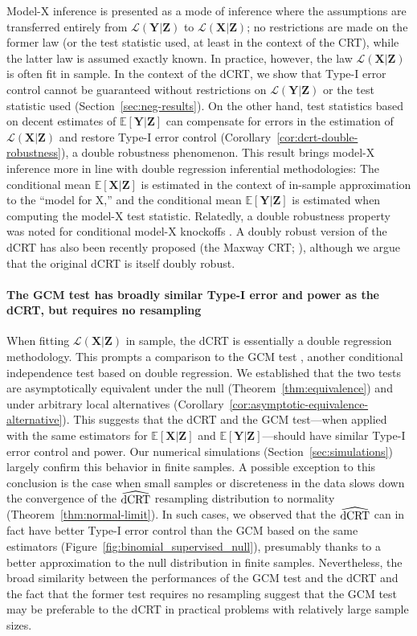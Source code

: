 \documentclass[aos]{imsart}
\theoremstyle{plain}
\theoremstyle{remark}
\newcommand{\E}{\mathbb E}								%
\newcommand{\prx}{\bm X}								%
\newcommand{\prz}{\bm Z}								%
\newcommand{\pry}{{\bm Y}}								%
\newcommand{\law}{\mathcal L}							%
\newcommand{\dCRThat}{\widehat{\textnormal{dCRT}}}		%
\begin{document}
Model-X inference \citep{CetL16} is presented as a mode of inference where the assumptions are transferred entirely from $\law(\pry|\prz)$ to $\law(\prx|\prz)$; no restrictions are made on the former law (or the test statistic used, at least in the context of the CRT), while the latter law is assumed exactly known. In practice, however, the law $\law(\prx|\prz)$ is often fit in sample. In the context of the dCRT, we show that Type-I error control cannot be guaranteed without restrictions on $\law(\pry|\prz)$ or the test statistic used (Section~\ref{sec:neg-results}). On the other hand, test statistics based on decent estimates of $\E[\pry|\prz]$ can compensate for errors in the estimation of $\law(\prx|\prz)$ and restore Type-I error control (Corollary~\ref{cor:dcrt-double-robustness}), a double robustness phenomenon. This result brings model-X inference more in line with double regression inferential methodologies: The conditional mean $\E[\prx|\prz]$ is estimated in the context of in-sample approximation to the ``model for X,'' and the conditional mean $\E[\pry|\prz]$ is estimated when computing the model-X test statistic. Relatedly, a double robustness property was noted for conditional model-X knockoffs \citep{Huang2019}. A doubly robust version of the dCRT has also been recently proposed (the Maxway CRT; \cite{Li2022}), although we argue that the original dCRT is itself doubly robust.

\paragraph*{The GCM test has broadly similar Type-I error and power as the dCRT, but requires no resampling}

When fitting $\law(\prx|\prz)$ in sample, the dCRT is essentially a double regression methodology. This prompts a comparison to the GCM test \citep{Shah2018}, another conditional independence test based on double regression. We established that the two tests are asymptotically equivalent under the null (Theorem~\ref{thm:equivalence}) and under arbitrary local alternatives (Corollary~\ref{cor:asymptotic-equivalence-alternative}). This suggests that the dCRT and the GCM test---when applied with the same estimators for $\E[\prx|\prz]$ and $\E[\pry|\prz]$---should have similar Type-I error control and power. Our numerical simulations (Section~\ref{sec:simulations}) largely confirm this behavior in finite samples. A possible exception to this conclusion is the case when small samples or discreteness in the data slows down the convergence of the $\dCRThat$ resampling distribution to normality (Theorem~\ref{thm:normal-limit}). In such cases, we observed that the $\dCRThat$ can in fact have better Type-I error control than the GCM based on the same estimators (Figure~\ref{fig:binomial_supervised_null}), presumably thanks to a better approximation to the null distribution in finite samples. Nevertheless, the broad similarity between the performances of the GCM test and the dCRT and the fact that the former test requires no resampling suggest that the GCM test may be preferable to the dCRT in practical problems with relatively large sample sizes.
\end{document}
